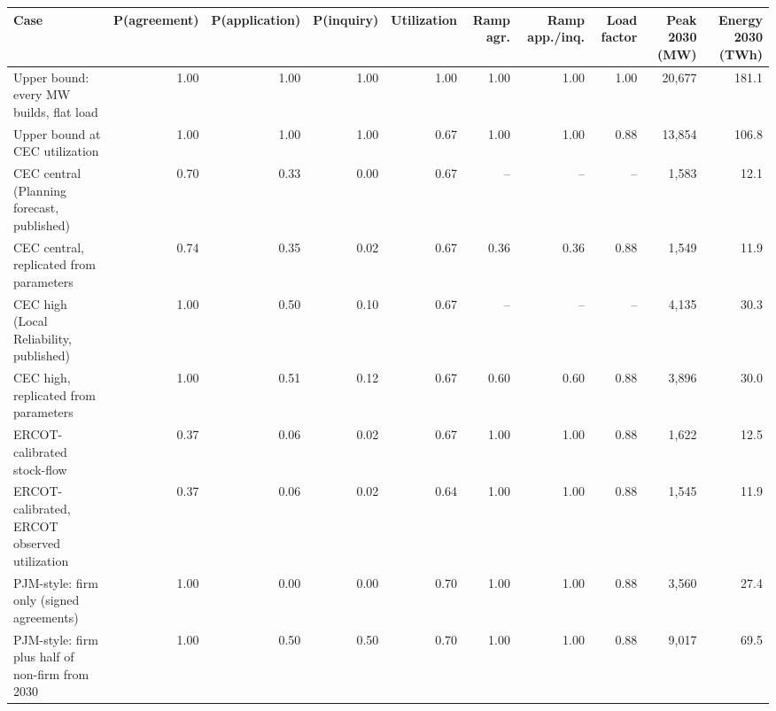 \begin{tabular}{lrrrrrrrrr}
\toprule
Case & P(agreement) & P(application) & P(inquiry) & Utilization & Ramp agr. & Ramp app./inq. & Load factor & Peak 2030 (MW) & Energy 2030 (TWh) \\
\midrule
Upper bound: every MW builds, flat load & 1.00 & 1.00 & 1.00 & 1.00 & 1.00 & 1.00 & 1.00 & 20,677 & 181.1 \\
Upper bound at CEC utilization & 1.00 & 1.00 & 1.00 & 0.67 & 1.00 & 1.00 & 0.88 & 13,854 & 106.8 \\
CEC central (Planning forecast, published) & 0.70 & 0.33 & 0.00 & 0.67 & -- & -- & -- & 1,583 & 12.1 \\
CEC central, replicated from parameters & 0.74 & 0.35 & 0.02 & 0.67 & 0.36 & 0.36 & 0.88 & 1,549 & 11.9 \\
CEC high (Local Reliability, published) & 1.00 & 0.50 & 0.10 & 0.67 & -- & -- & -- & 4,135 & 30.3 \\
CEC high, replicated from parameters & 1.00 & 0.51 & 0.12 & 0.67 & 0.60 & 0.60 & 0.88 & 3,896 & 30.0 \\
ERCOT-calibrated stock-flow & 0.37 & 0.06 & 0.02 & 0.67 & 1.00 & 1.00 & 0.88 & 1,622 & 12.5 \\
ERCOT-calibrated, ERCOT observed utilization & 0.37 & 0.06 & 0.02 & 0.64 & 1.00 & 1.00 & 0.88 & 1,545 & 11.9 \\
PJM-style: firm only (signed agreements) & 1.00 & 0.00 & 0.00 & 0.70 & 1.00 & 1.00 & 0.88 & 3,560 & 27.4 \\
PJM-style: firm plus half of non-firm from 2030 & 1.00 & 0.50 & 0.50 & 0.70 & 1.00 & 1.00 & 0.88 & 9,017 & 69.5 \\
\bottomrule
\end{tabular}